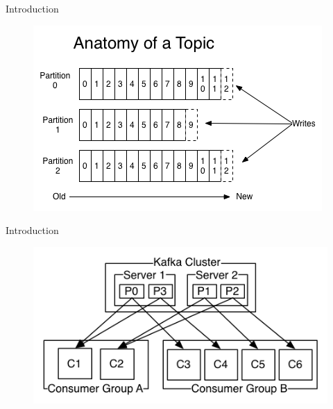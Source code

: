 \begin{frame}[plain,t]{Introduction} %
    \vspace{2ex}
    \begin{figure}
        \centering
        \includegraphics[width=0.8\linewidth]{image/0102}
        \label{fig:0102}
    \end{figure}
    
    
    
    
\end{frame}
\begin{frame}[plain,t]{Introduction} %
    \vspace{2ex}
     \begin{figure}
        \centering
        \includegraphics[width=0.9\linewidth]{image/0103}
        \label{fig:0103}
    \end{figure}
    
    
    
    
\end{frame}
